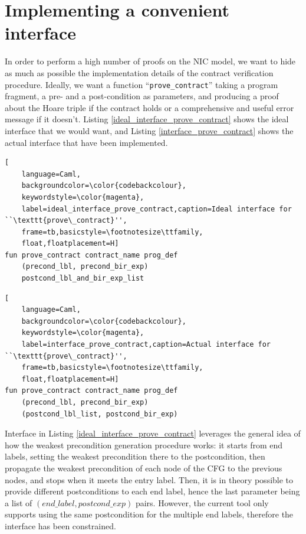 \documentclass{kththesis}
\begin{document}

\section{Implementing a convenient interface} \label{impl_convenient_ht_interface}

In order to perform a high number of proofs on the \gls{NIC} model, we want to hide as much as possible the implementation details of the contract verification procedure. Ideally, we want a function ``\texttt{prove\_contract}'' taking a program fragment, a pre- and a post-condition as parameters, and producing a proof about the Hoare triple if the contract holds or a comprehensive and useful error message if it doesn't. Listing \ref{ideal_interface_prove_contract} shows the ideal interface that we would want, and Listing \ref{interface_prove_contract} shows the actual interface that have been implemented.

\begin{lstlisting}[
    language=Caml,
    backgroundcolor=\color{codebackcolour},
    keywordstyle=\color{magenta},
    label=ideal_interface_prove_contract,caption=Ideal interface for ``\texttt{prove\_contract}'',
    frame=tb,basicstyle=\footnotesize\ttfamily,
    float,floatplacement=H]
fun prove_contract contract_name prog_def
    (precond_lbl, precond_bir_exp)
    postcond_lbl_and_bir_exp_list
\end{lstlisting}

\begin{lstlisting}[
    language=Caml,
    backgroundcolor=\color{codebackcolour},
    keywordstyle=\color{magenta},
    label=interface_prove_contract,caption=Actual interface for ``\texttt{prove\_contract}'',
    frame=tb,basicstyle=\footnotesize\ttfamily,
    float,floatplacement=H]
fun prove_contract contract_name prog_def
    (precond_lbl, precond_bir_exp)
    (postcond_lbl_list, postcond_bir_exp)
\end{lstlisting}

Interface in Listing \ref{ideal_interface_prove_contract} leverages the general idea of how the weakest precondition generation procedure works: it starts from end labels, setting the weakest precondition there to the postcondition, then propagate the weakest precondition of each node of the \gls{CFG} to the previous nodes, and stops when it meets the entry label. Then, it is in theory possible to provide different postconditions to each end label, hence the last parameter being a list of $(end\_label, postcond\_exp)$ pairs. However, the current tool only supports using the same postcondition for the multiple end labels, therefore the interface has been constrained\footnotemark.
\end{document}
